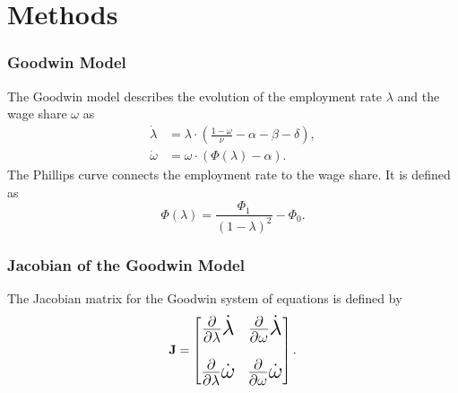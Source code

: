\documentclass{beamer}
\begin{document}
\section{Methods}
\begin{frame}
\frametitle{Goodwin Model}
The Goodwin model \citep{p4} describes the evolution of the employment rate $\lambda$ and the wage share $\omega$ as
\begin{equation}
\begin{split}
    \dot{\lambda} &= \lambda \cdot \left( \frac{1-\omega}{\nu} - \alpha - \beta - \delta \right), \\
    \dot{\omega} &= \omega \cdot (\Phi(\lambda) - \alpha).
\end{split}
\end{equation}
The Phillips curve connects the employment rate to the wage share. It is defined as
\begin{equation} \label{eq:keenPhil}
    \Phi(\lambda) = \frac{\Phi_1}{(1-\lambda)^2}-\Phi_0.
\end{equation}
\end{frame}
\begin{frame}
\frametitle{Jacobian of the Goodwin Model}
The Jacobian matrix for the Goodwin system of equations is defined by
\begin{equation} \label{eq:goodwinJ}
\LARGE
\mathbf J =
\begin{bmatrix}
    \pdv{\lambda}\dot{\lambda} & \pdv{\omega}\dot{\lambda}\\[0.8em]
    \pdv{\lambda}\dot{\omega} &  \pdv{\omega}\dot{\omega}
\end{bmatrix}.
\end{equation}
\normalsize
\end{frame}
\end{document}
